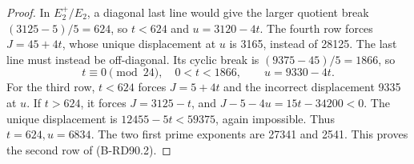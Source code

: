 \begin{proof}
In \(E_2^+/E_2\), a diagonal last line would give the larger
quotient break \((3125-5)/5=624\), so \(t<624\) and
\(u=3120-4t\). The fourth row forces \(J=45+4t\), whose
unique displacement at \(u\) is 3165, instead of 28125.
The last line must instead be off-diagonal. Its cyclic break
is \((9375-45)/5=1866\), so
\[
             t\equiv0\pmod{24},\quad 0<t<1866,
             \qquad u=9330-4t.                      \tag{B-RD90.7}
\]
For the third row, \(t<624\) forces \(J=5+4t\) and the
incorrect displacement 9335 at \(u\). If \(t>624\), it forces
\(J=3125-t\), and
\(J-5-4u=15t-34200<0\). The unique displacement is
\(12455-5t<59375\), again impossible. Thus \(t=624,u=6834\).
The two first prime exponents are 27341 and 2541. This proves
the second row of (B-RD90.2).
\end{proof}

